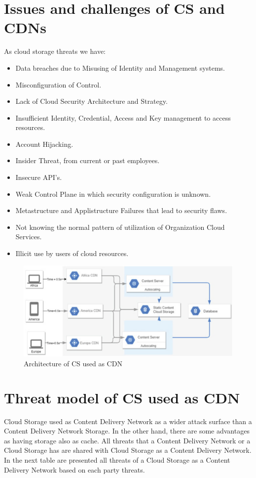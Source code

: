 \documentclass[14pt,oneside]{extreport}
\newcommand*\fpar{\hspace{1ex}}
\begin{document}
\section{Issues and challenges of CS and CDNs}
\fpar As cloud storage threats we have: 
\vspace{-1em}
\begin{itemize}[noitemsep]
  \item Data breaches due to Misusing of Identity and Management systems. 
  \item Misconfiguration of Control.
  \item Lack of Cloud Security Architecture and Strategy.
  \item Insufficient Identity, Credential, Access and Key management to access resources.
  \item Account Hijacking. 
  \item Insider Threat, from current or past employees. 
  \item Insecure API's. 
  \item Weak Control Plane in which security configuration is unknown. 
  \item Metastructure and Applistructure Failures that lead to security flaws. 
  \item Not knowing the normal pattern of utilization of Organization Cloud Services. 
  \item Illicit use by users of cloud resources.
\end{itemize}
\begin{figure}[H]
  \centering
  \includegraphics[width=\textwidth]{paper3/threats.png}
  \caption{Architecture of CS used as CDN}
  \label{fig:TODO}
\end{figure}

\section{Threat model of CS used as CDN}
\fpar Cloud Storage used as Content Delivery Network as a wider attack surface than a Content Delivery Network Storage. In the other hand, there are some advantages as having storage also as cache. All threats that a Content Delivery Network or a Cloud Storage has are shared with Cloud Storage as a Content Delivery Network. In the next table are presented all threats of a Cloud Storage as a Content Delivery Network based on each party threats.
\end{document}
